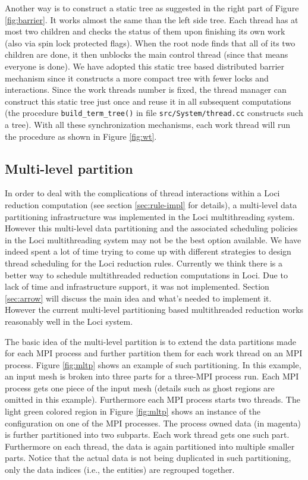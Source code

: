\documentclass{article}
\begin{document}
Another way is to construct a static tree as suggested in the right
part of Figure \ref{fig:barrier}.  It works almost the same than the
left side tree.  Each thread has at most two children and checks the
status of them upon finishing its own work (also via spin lock
protected flags).  When the root node finds that all of its two
children are done, it then unblocks the main control thread (since
that means everyone is done).  We have adopted this static tree based
distributed barrier mechanism since it constructs a more compact tree
with fewer locks and interactions.  Since the work threads number is
fixed, the thread manager can construct this static tree just once and
reuse it in all subsequent computations (the procedure
\lstinline{build_term_tree()} in file \texttt{src/System/thread.cc}
constructs such a tree).  With all these synchronization mechanisms,
each work thread will run the procedure as shown in Figure \ref{fig:wt}.

\subsection{Multi-level partition}
\label{sec:part}
In order to deal with the complications of thread interactions within a
Loci reduction computation (see section \ref{sec:rule-impl} for
details), a multi-level data partitioning infrastructure was implemented
in the Loci multithreading system.  However this multi-level data
partitioning and the associated scheduling policies in the Loci
multithreading system may not be the best option available.  We have
indeed spent a lot of time trying to come up with different strategies
to design thread scheduling for the Loci reduction rules.  Currently we
think there is a better way to schedule multithreaded reduction
computations in Loci.  Due to lack of time and infrastructure support,
it was not implemented.  Section \ref{sec:arrow} will discuss the main
idea and what's needed to implement it.  However the current multi-level
partitioning based multithreaded reduction works reasonably well in the
Loci system.

The basic idea of the multi-level partition is to extend the data
partitions made for each MPI process and further partition them for each
work thread on an MPI process.  Figure \ref{fig:mltp} shows an example
of such partitioning.  In this example, an input mesh is broken into
three parts for a three-MPI process run.  Each MPI process gets one
piece of the input mesh (details such as ghost regions are omitted in
this example).  Furthermore each MPI process starts two threads.  The
light green colored region in Figure \ref{fig:mltp} shows an instance of
the configuration on one of the MPI processes.  The process owned data
(in magenta) is further partitioned into two subparts.  Each work thread
gets one such part.  Furthermore on each thread, the data is again
partitioned into multiple smaller parts.  Notice that the actual data is
not being duplicated in such partitioning, only the data indices (i.e.,
the entities) are regrouped together.
\end{document}
